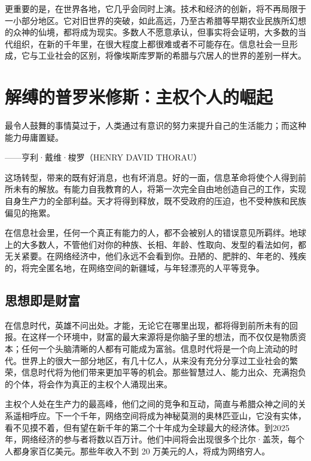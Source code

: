 更重要的是，在世界各地，它几乎会同时上演。技术和经济的创新，将不再局限于一小部分地区。它对旧世界的突破，如此高远，乃至古希腊等早期农业民族所幻想的众神的仙境，都将成为现实。多数人不愿意承认，但事实将会证明，大多数的当代组织，在新的千年里，在很大程度上都很难或者不可能存在。信息社会一旦形成，它与工业社会的区别，将像埃斯库罗斯的希腊与穴居人的世界的差别一样大。



\section{解缚的普罗米修斯：主权个人的崛起}

\begin{tcolorbox}
最令人鼓舞的事情莫过于，人类通过有意识的努力来提升自己的生活能力；而这种能力毋庸置疑。
\begin{flushright}
——亨利·戴维·梭罗（HENRY DAVID THORAU）
\end{flushright}
\end{tcolorbox}

这场转型，带来的既有好消息，也有坏消息。好的一面，信息革命将使个人得到前所未有的解放。有能力自我教育的人，将第一次完全自由地创造自己的工作，实现自身生产力的全部利益。天才将得到释放，既不受政府的压迫，也不受种族和民族偏见的拖累。


在信息社会里，任何一个真正有能力的人，都不会被别人的错误意见所羁绊。地球上的大多数人，不管他们对你的种族、长相、年龄、性取向、发型的看法如何，都无关紧要。在网络经济中，他们永远不会看到你。丑陋的、肥胖的、年老的、残疾的，将完全匿名地，在网络空间的新疆域，与年轻漂亮的人平等竞争。



\subsection{思想即是财富}
在信息时代，英雄不问出处。才能，无论它在哪里出现，都将得到前所未有的回报。在这样一个环境中，财富的最大来源将是你脑子里的想法，而不仅仅是物质资本；任何一个头脑清晰的人都有可能成为富翁。信息时代将是一个向上流动的时代。世界上的很大一部分地区，有几十亿人，从来没有充分分享过工业社会的繁荣，信息时代将为他们带来更加平等的机会。那些智慧过人、能力出众、充满抱负的个体，将会作为真正的主权个人涌现出来。


主权个人处在生产力的最高峰，他们之间的竞争和互动，简直与希腊众神之间的关系遥相呼应。下一个千年，网络空间将成为神秘莫测的奥林匹亚山，它没有实体，看不见摸不着，但有望在新千年的第二个十年成为全球最大的经济体。到2025 年，网络经济的参与者将数以百万计。他们中间将会出现很多个比尔·盖茨，每个人都身家百亿美元。那些年收入不到 20 万美元的人，将成为网络穷人。



